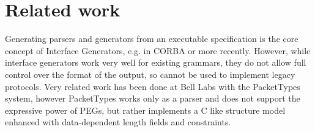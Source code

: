 \section{Related work}

Generating parsers and generators from an executable specification is the core concept of Interface
Generators, e.g. in CORBA or more recently\cite{varda2008}. However, while interface
generators work very well for existing grammars, they do not allow full control over the format of
the output, so cannot be used to implement legacy protocols.
Very related work has been done at Bell Labs with the PacketTypes system\cite{mccann2000packet},
however PacketTypes works only as a parser and does not support the expressive power of PEGs, but rather
implements a C like structure model enhanced with data-dependent length fields and constraints.

\begin{comment}

Memory corruption exploits (frequently) rely on placing controlled values at known (or controlled)
memory locations. Exploit countermeasures  like Address-Space Layout Randomisation\cite{pax-aslr},
 heap cookies \cite{heapcookies} or data execution prevention try to make this harder for
 an attacker. Attackers have developed techniques such as heap spraying \cite{heapspray} and heap
 feng shui\cite{fengshui} to help bypass those mitigations. 


Nail parsers use two arena allocators\cite{arena}, one for the temporary syntax tree and one for the
result. If Nail were to use the normal system allocator, the attacker could cause two packets to be
parsed at the same time (or, given a sufficiently complicated input, two structure within the same
grammar to be parsed sequentially) such that the (invalid) intermediate results from one parse,  
 If there is a buffer overflow past the
end of one input, it is much harder for the attacker craft a sequence of packets to trick the allocator into
placing a known value next to that input.

\end{comment}
